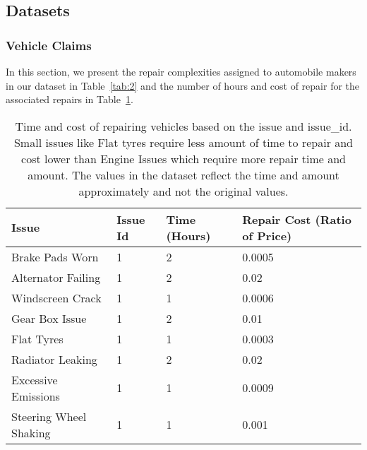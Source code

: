 \documentclass{article}
\begin{document}
\subsection{Datasets}\label{a1}

\subsubsection{Vehicle Claims}
In this section, we present the repair complexities assigned to automobile makers in our dataset in Table~\ref{tab:2} and the number of hours and cost of repair for the associated repairs in Table~\ref{tab:3}.


\begin{table}[htbp]
\caption{Time and cost of repairing vehicles based on the issue and issue\_id. Small issues like Flat tyres require less amount of time to repair and cost lower than Engine Issues which require more repair time and amount. The values in the dataset reflect the time and amount approximately and not the original values.}
\label{tab:3}
\begin{tabular}{llll}
\hline
\textbf{Issue}         & \textbf{Issue Id} & \textbf{Time (Hours)}           & \textbf{Repair Cost (Ratio of Price)}                \\ \hline
Brake Pads Worn        & 1                 & 2                       & 0.0005                                               \\ 
Alternator Failing     & 1                 & 2                       & 0.02                                                 \\ 
Windscreen Crack       & 1                 & 1                       & 0.0006                                               \\ 
Gear Box Issue         & 1                 & 2                       & 0.01                                                 \\ 
Flat Tyres             & 1                 & 1                       & 0.0003                                               \\ 
Radiator Leaking       & 1                 & 2                       & 0.02                                                 \\ 
Excessive Emissions    & 1                 & 1                       & 0.0009                                               \\
Steering Wheel Shaking & 1                 & 1                       & 0.001                                                \\ 

\end{tabular}
\end{table}
\end{document}
